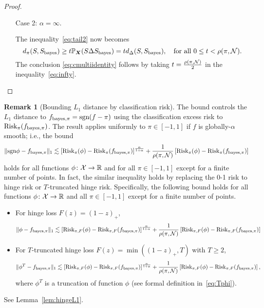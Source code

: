 \documentclass[11pt]{article}
\theoremstyle{plain}
\theoremstyle{definition}
\newtheorem{rmk}{Remark}
\def\sign{\textup{sgn}}
\def\bayesS{S_{\textup{bayes}}}
\def\bayespif{f_{\textup{bayes},\pi}}
\def\risk{\textup{Risk}_\pi}
\def\riskF{\textup{Risk}_{\pi,F}}
\begin{document}
\begin{proof}
\begin{enumerate}[label={2.\arabic*},wide, labelwidth=!, labelindent=0pt]
\item [Case 2:] $\alpha = \infty$.

The inequality~\eqref{eq:tail2} now becomes
\begin{equation}\label{eq:infty}
d_\pi(S,\bayesS)\geq t\mathbb{P}_{\mX}(S\Delta \bayesS) = td_\Delta(S,\bayesS), \quad \text{for all }0\leq t < \rho(\pi,\tN).
\end{equation}
The conclusion \eqref{eq:cmultiidentity} follows by taking $t={\rho(\pi,\mathcal{N})\over 2}$ in the inequality~\eqref{eq:infty}. 
\end{enumerate}
\end{proof}


\begin{rmk}[Bounding $L_1$ distance by classification risk]\label{eq:rmk} The bound controls the $L_1$ distance to $\bayespif=\sign(f-\pi)$ using the classification excess risk to $\risk(\bayespif)$. The result applies uniformly to $\pi\in[-1,1]$ if $f$ is globally-$\alpha$ smooth; i.e., the bound
\begin{equation}\label{eq:L1}
\onenormSize{}{\sign \phi-\bayespif} \lesssim \left[\risk(\phi)-\risk(\bayespif)\right]^{\alpha \over 1+\alpha}+{1\over \rho(\pi, \tN)}\left[\risk(\phi)-\risk(\bayespif)\right]
\end{equation}
holds for all functions $\phi\colon \mathcal{X}\to\mathbb{R}$ and for all $\pi\in[-1,1]$ except for a finite number of points. 
In fact, the similar inequality holds by replacing the 0-1 risk to hinge risk or $T$-truncated hinge risk. Specifically, the following bound holds for all functions $\phi\colon \mathcal{X}\to \mathbb{R}$ and all $\pi\in[-1,1]$ except for a finite number of points.
\begin{itemize}
\item For hinge loss $F(z)=(1-z)_{+}$,
\[
\onenormSize{}{\phi-\bayespif} \lesssim \left[\riskF(\phi)-\riskF(\bayespif)\right]^{\alpha \over 1+\alpha}+{1\over \rho(\pi, \tN)}\left[\riskF(\phi)-\riskF(\bayespif)\right]
\]
\item For $T$-truncated hinge loss $F(z)=\min((1-z)_{+},T)$ with $T\geq 2$,
\[
\onenormSize{}{\phi^T-\bayespif} \lesssim \left[\riskF(\phi)-\riskF(\bayespif)\right]^{\alpha \over 1+\alpha}+{1\over \rho(\pi, \tN)}\left[\riskF(\phi)-\riskF(\bayespif)\right],
\]
where $\phi^T$ is a truncation of function $\phi$ (see formal definition in~\eqref{eq:Tphi}).
\end{itemize}
See Lemma~\ref{lem:hingeL1}.
\end{rmk}
\end{document}
